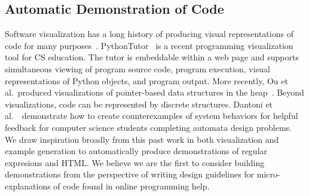 \subsection{Automatic Demonstration of Code}

Software visualization has a long history of producing visual representations of code for many purposes~\cite{sorva_visual_2012}.
PythonTutor~\cite{guo_online_2013} is a recent programming visualization tool for CS education.
The tutor is embeddable within a web page and supports simultaneous viewing of program source code, program execution, visual representations of Python objects, and program output.
More recently, Ou et al.\ produced visualizations of pointer-based data structures in the heap~\cite{ou_interactive_2015}.
Beyond visualizations, code can be represented by discrete structures.
Dantoni et al.~\cite{dantoni_how_2015}\ demonstrate how to create counterexamples of system behaviors for helpful feedback for computer science students completing automata design problems.
We draw inspiration broadly from this past work in both visualization and example generation to automatically produce demonstrations of regular expresions and HTML\@.
We believe we are the first to consider building demonstrations from the perspective of writing design guidelines for micro-explanations of code found in online programming help.

